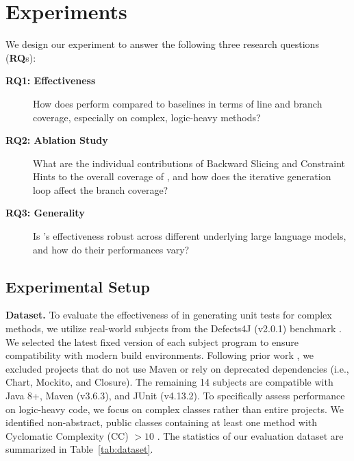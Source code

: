 \section{Experiments}



We design our experiment to answer the following three research questions (\textbf{RQ}s):

\begin{description}
\item[\textbf{RQ1: Effectiveness}] 
How does \ourmethod{} perform compared to baselines in terms of line and branch coverage, especially on complex, logic-heavy methods?

\item[\textbf{RQ2: Ablation Study}]
What are the individual contributions of Backward Slicing and Constraint Hints to the overall coverage of \ourmethod{}, and how does the iterative generation loop affect the branch coverage?

\item[\textbf{RQ3: Generality}]
Is \ourmethod{}'s effectiveness robust across different underlying large language models, and how do their performances vary?
\end{description}

\subsection{Experimental Setup}



\textbf{Dataset.} To evaluate the effectiveness of \ourmethod{} in generating unit tests for complex methods, we utilize real-world subjects from the Defects4J (v2.0.1) benchmark \cite{defects4j}. 
We selected the latest fixed version of each subject program to ensure compatibility with modern build environments. 
Following prior work \cite{gu2025a}, we excluded projects that do not use Maven or rely on deprecated dependencies (i.e., Chart, Mockito, and Closure). 
The remaining 14 subjects are compatible with Java 8+, Maven (v3.6.3), and JUnit (v4.13.2).
To specifically assess performance on logic-heavy code, we focus on complex classes rather than entire projects. 
We identified non-abstract, public classes containing at least one method with Cyclomatic Complexity (CC) $> 10$ \cite{mccabe1976complexity}. 
The statistics of our evaluation dataset are summarized in Table~\ref{tab:dataset}.



